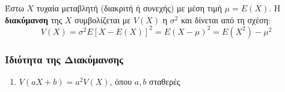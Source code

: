 Έστω $X$ τυχαία μεταβλητή (διακριτή ή συνεχής) με μέση τιμή $\mu=E(X)$. Η
\textbf{διακύμανση} της $X$ συμβολίζεται με $V(X)$ η $\sigma^{2}$ και δίνεται
από τη σχέση:
\begin{equation*}
  V(X)=\sigma^{2}E[X-E(X)]^{2}=E(X-\mu)^{2}=E(X^{2})-\mu^{2}
\end{equation*}

\subsubsection*{Ιδιότητα της Διακύμανσης}

\begin{enumerate}
  \item $V(aX+b)=a^{2}V(X)$, όπου $a,b$ σταθερές
\end{enumerate}
